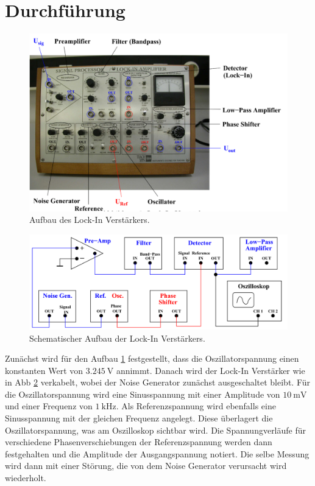 \section{Durchführung}

\begin{figure}[H]
    \centering
    \includegraphics{Bilder/LockIn.png}
    \caption{Aufbau des Lock-In Verstärkers.\cite{V303}}
    \label{fig:LockIn}
\end{figure}
\begin{figure}[H]
    \centering
    \includegraphics{Bilder/LockInShema.png}
    \caption{Schematischer Aufbau der Lock-In Verstärkers. \cite{V303}}
    \label{fig:LockInSchema}
\end{figure}

\noindent 
Zunächst wird für den Aufbau \ref{fig:LockIn} festgestellt, dass die Oszillatorspannung einen konstanten Wert von $\qty{3,245}{\volt}$ annimmt.
Danach wird der Lock-In Verstärker wie in Abb \ref{fig:LockInSchema} verkabelt, wobei der Noise Generator zunächst ausgeschaltet bleibt.
Für die Oszillatorspannung wird eine Sinusspannung mit einer Amplitude von $\qty{10}{\milli\volt}$ und einer Frequenz von 
$\qty{1}{\kilo\hertz}$. Als Referenzspannung wird ebenfalls eine Sinusspannung mit der gleichen Frequenz angelegt. Diese überlagert
die Oszillatorspannung, was am Oszilloskop sichtbar wird. Die Spannungverläufe für verschiedene Phasenverschiebungen der Referenzspannung
werden dann festgehalten und die Amplitude der Ausgangspannung notiert. Die selbe Messung wird dann mit einer Störung, die 
von dem Noise Generator verursacht wird wiederholt. \\

